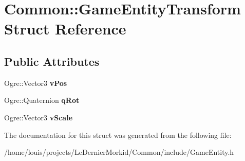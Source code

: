 \hypertarget{struct_common_1_1_game_entity_transform}{}\section{Common\+:\+:Game\+Entity\+Transform Struct Reference}
\label{struct_common_1_1_game_entity_transform}
\subsection*{Public Attributes}
\begin{DoxyCompactItemize}
\item 
\mbox{\label{struct_common_1_1_game_entity_transform_adb2f2de17915c25bb9d4c67d44fe0fd1}} 
Ogre\+::\+Vector3 {\bfseries v\+Pos}
\item 
\mbox{\label{struct_common_1_1_game_entity_transform_acd1fccda4d680b79073f5a6d7bb198d4}} 
Ogre\+::\+Quaternion {\bfseries q\+Rot}
\item 
\mbox{\label{struct_common_1_1_game_entity_transform_a47cc10b536e85e01efe0cd86185c4c0d}} 
Ogre\+::\+Vector3 {\bfseries v\+Scale}
\end{DoxyCompactItemize}


The documentation for this struct was generated from the following file\+:\begin{DoxyCompactItemize}
\item 
/home/louis/projects/\+Le\+Dernier\+Morkid/\+Common/include/Game\+Entity.\+h\end{DoxyCompactItemize}

